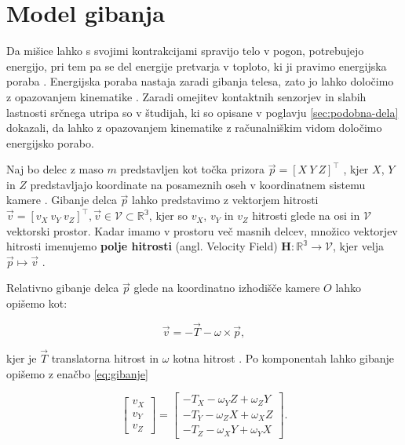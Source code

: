 \section{Model gibanja}\label{sec:model-gibanja}
Da mišice lahko s svojimi kontrakcijami spravijo telo v pogon, potrebujejo energijo, pri tem pa se del energije pretvarja v toploto, ki ji pravimo energijska poraba \cite{scott2005misconceptions}. Energijska poraba nastaja zaradi gibanja telesa, zato jo lahko določimo z opazovanjem kinematike \cite{levine2005measurement}. Zaradi omejitev kontaktnih senzorjev in slabih lastnosti srčnega utripa so v študijah, ki so opisane v poglavju \ref{sec:podobna-dela} dokazali, da lahko z opazovanjem kinematike z računalniškim vidom določimo energijsko porabo. 

Naj bo delec z maso $m$ predstavljen kot točka prizora $\vec{p} = [X~Y~Z]^\top$ , kjer $X$, $Y$ in $Z$ predstavljajo koordinate na posameznih oseh v koordinatnem sistemu kamere \cite{trucco1998introductory}. Gibanje delca $\vec{p}$ lahko predstavimo z vektorjem hitrosti $\vec{v} = [v_X~v_Y~v_Z]^\top, \vec{v} \in \mathcal{V} \subset \mathbb{R^3}$, kjer so $v_X$, $v_Y$ in $v_Z$ hitrosti glede na osi in $\mathcal{V}$ vektorski prostor. Kadar imamo v prostoru več masnih delcev, množico vektorjev hitrosti imenujemo \textbf{polje hitrosti} (angl. Velocity Field) $\mathbf{H}: \mathbb{R^3} \to \mathcal{V}$, kjer velja $\vec{p} \mapsto \vec{v}$ \cite{trucco1998introductory}. 

Relativno gibanje delca $\vec{p}$ glede na koordinatno izhodišče kamere $O$ lahko opišemo kot:

\begin{equation}
	\vec{v} = -\vec{T}-\omega\times\vec{p},
\end{equation}

kjer je $\vec{T}$ translatorna hitrost in $\omega$ kotna hitrost \cite{trucco1998introductory}. Po komponentah lahko gibanje opišemo z enačbo \eqref{eq:gibanje}

\begin{equation} \label{eq:gibanje}
	\begin{bmatrix}
	v_X \\ v_Y \\ v_Z
	\end{bmatrix}
    =
    \begin{bmatrix}
    - T_X - \omega_Y Z + \omega_Z Y \\
    - T_Y - \omega_Z X + \omega_X Z \\
    - T_Z - \omega_X Y + \omega_Y X
    \end{bmatrix}.
\end{equation}

